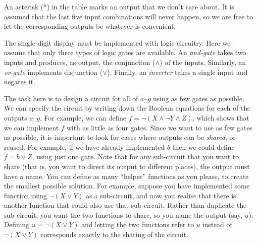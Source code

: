 \documentclass[12pt]{article}
\begin{document}
\begin{minipage}{0.3\textwidth}
\begin{center}
\end{center}
\end{minipage}

\noindent
An asterisk (*) in the table marks an output that we don't care about.
It is assumed that the last five input combinations will never 
happen, so we are free to let the corresponding outputs be 
whatever is convenient.

The single-digit display must be implemented with logic circuitry.
Here we assume that only three types of logic gates are available.
An \emph{and-gate} takes two inputs and produces, as output, the
conjunction ($\land$) of the inputs.
Similarly, an \emph{or-gate} implements disjunction ($\lor$).
Finally, an \emph{inverter} takes a single input and negates it.

The task here is to design a circuit for all of $a$--$g$ using as
few gates as possible.
We can specify the circuit by writing down the Boolean equations
for each of the outputs $a$--$g$.
For example, we can define 
$f = \neg (X \land \neg Y \land Z)$,
which shows that we can implement $f$ with as little as four gates.
Since we want to use as few gates as possible, it is important to
look for cases where outputs can be \emph{shared}, or reused.
For example, if we have already implemented $b$ then we could define
$f = b \lor Z$, using just one gate.
Note that for any sub-circuit that you want to share 
(that is, you want to direct its output to different places), 
the output must have a name.
You can define as many ``helper'' functions as you please, to
create the smallest possible solution.
For example, suppose you have implemented some function using
$\neg (X \lor Y)$ as a sub-circuit, and now you realise that
there is another function that could also use that sub-circuit.
Rather than duplicate the sub-circuit, you want the two functions
to share, so you name the output (say, $u$).
Defining $u = \neg (X \lor Y)$ and letting the two functions
refer to $u$ instead of $\neg (X \lor Y)$ corresponds exactly to
the sharing of the circuit.
\end{document}
